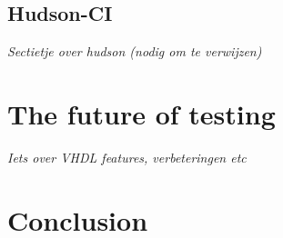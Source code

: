 \documentclass[11pt,british]{article}
\newcommand\blankpage{%
    \null
    \thispagestyle{empty}%
    \addtocounter{page}{-1}%
    \newpage}
\begin{document}

\subsection{Hudson-CI}
\label{subsec:CI}\emph{\color{red}Sectietje over hudson (nodig om te verwijzen)}

\newpage{}
\section{The future of testing}
\emph{\color{red} Iets over VHDL features, verbeteringen etc}

\newpage{}
\section{Conclusion}

\pagebreak{}

\printbibliography

%
%
%
%
%
%
%
%


%


\afterpage{\blankpage}
\end{document}
